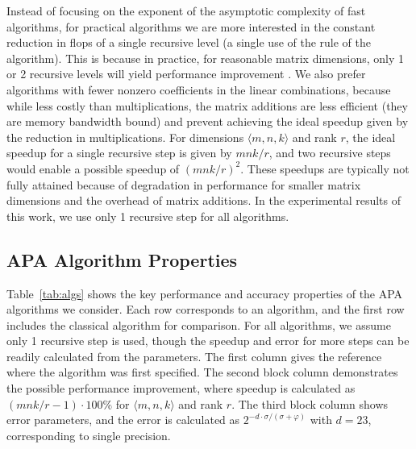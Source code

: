 \documentclass[manuscript]{acmart}
\newcommand{\dims}[1]{\langle #1 \rangle}
\begin{document}
Instead of focusing on the exponent of the asymptotic complexity of fast algorithms, for practical algorithms we are more interested in the constant reduction in flops of a single recursive level (a single use of the rule of the algorithm).
This is because in practice, for reasonable matrix dimensions, only 1 or 2 recursive levels will yield performance improvement \cite{BB15}.
We also prefer algorithms with fewer nonzero coefficients in the linear combinations, because while less costly than multiplications, the matrix additions are less efficient (they are memory bandwidth bound) and prevent achieving the ideal speedup given by the reduction in multiplications.
For dimensions $\dims{m,n,k}$ and rank $r$, the ideal speedup for a single recursive step is given by $mnk/r$, and two recursive steps would enable a possible speedup of $(mnk/r)^2$.
These speedups are typically not fully attained because of degradation in performance for smaller matrix dimensions and the overhead of matrix additions.
In the experimental results of this work, we use only 1 recursive step for all algorithms.

\subsection{APA Algorithm Properties}
\label{sec:APAprops}

Table~\ref{tab:algs} shows the key performance and accuracy properties of the APA algorithms we consider.
Each row corresponds to an algorithm, and the first row includes the classical algorithm for comparison.
For all algorithms, we assume only 1 recursive step is used, though the speedup and error for more steps can be readily calculated from the parameters.
The first column gives the reference where the algorithm was first specified.
The second block column demonstrates the possible performance improvement, where speedup is calculated as $(mnk/r - 1)\cdot100\%$ for $\dims{m,n,k}$ and rank $r$.
The third block column shows error parameters, and the error is calculated as $2^{-d\cdot\sigma/(\sigma+\varphi)}$ with $d=23$, corresponding to single precision.
\end{document}
